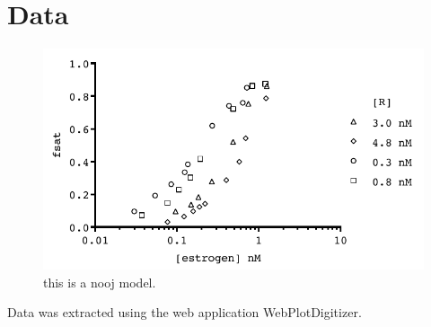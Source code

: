 \section{Data}
\blindtext[3]
\begin{figure}[h]
\centering
\includegraphics{./Figures/notides_pull.pdf}
\caption{this is a nooj model. \supercite{notides_positive_1981}}
\end{figure}
\blindtext[4]
Data was extracted using the web application WebPlotDigitizer. \supercite{rohatgi_webplotdigitizer_2015}
